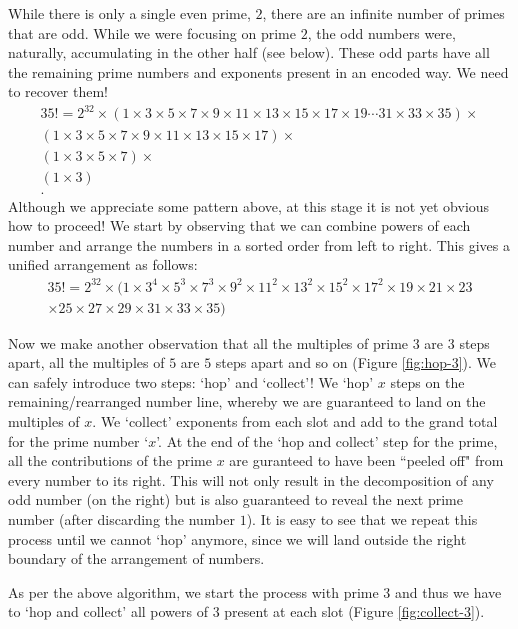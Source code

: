 \documentclass[10 pt,a4paper, article]{amsart}
\begin{document}
While there is only a single even prime, $2$, there are an infinite number of primes that are odd. While we were focusing on prime $2$, the odd numbers were, naturally, accumulating in the other half (see below). These odd parts have all the remaining prime numbers and exponents present in an encoded way. We need to recover them! 
\begin{align*}
35! = {2^{32}}\times(1 \times 3 \times 5 \times 7 \times 9 \times 11 \times 13 \times 15 \times 17 \times 19 \cdots 31 \times 33 \times 35) \times \\
(1 \times 3 \times 5 \times 7 \times 9 \times 11 \times 13 \times 15 \times 17) \times \\
(1 \times 3 \times 5 \times 7) \times \\
(1 \times 3) \\
.
\end{align*} 
Although we appreciate some pattern above, at this stage it is not yet obvious how to proceed! We start by observing that we can combine powers of each number and arrange the numbers in a sorted order from left to right. This gives a unified arrangement as follows:
\begin{multline*}
35! = {2^{32}} \times (1 \times 3^{4} \times 5^{3} \times 7^{3} \times 9^2 \times 11^2 \times 13^2 \times 15^2 \times 17^2 \times 19 \times 21 \times 23 \\
\times 25 \times 27 \times 29 \times 31 \times 33 \times 35)
\end{multline*}

Now we make another observation that all the multiples of prime $3$ are $3$ steps apart, all the multiples of $5$ are $5$ steps apart and so on (Figure \ref{fig:hop-3}). We can safely introduce two steps: `hop' and `collect'! We `hop' $x$ steps on the remaining/rearranged number line, whereby we are guaranteed to land on the multiples of $x$. We `collect' exponents from each slot and add to the grand total for the prime number `$x$'. At the end of the `hop and collect' step for the prime, all the contributions of the prime $x$ are guranteed to have been ``peeled off" from every number to its right. This will not only result in the decomposition of any odd number (on the right) but is also guaranteed to reveal the next prime number (after discarding the number $1$). It is easy to see that we repeat this process until we cannot `hop' anymore, since we will land outside the right boundary of the arrangement of numbers.

As per the above algorithm, we start the process with prime $3$ and thus we have to `hop and collect' all powers of $3$ present at each slot (Figure \ref{fig:collect-3}).
\end{document}
